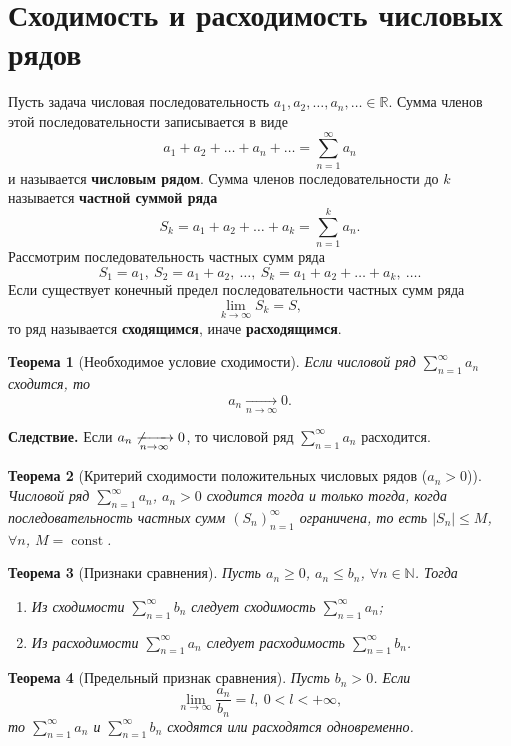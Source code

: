 \documentclass[a4paper, 12pt]{report}
\date{}
\numberwithin{equation}{section}
\renewcommand{\leq}{\leqslant}
\renewcommand{\geq}{\geqslant}
\newcommand{\const}{\operatorname{const}}
\newcommand{\sumn}{\sum\limits_{n=1}^\infty}
\newcommand{\sumnk}{\sum\limits_{n=1}^k}
\newtheorem*{theorem}{Теорема}
\begin{document}
	\newpage
	\section{Сходимость и расходимость числовых рядов}
	Пусть задача числовая последовательность $a_1, a_2,\ldots, a_n,\ldots \in \mathbb R$. 
	Сумма членов этой последовательности записывается в виде
	\begin{equation}
		a_1 + a_2 + \ldots + a_n + \ldots = \sumn a_n
	\end{equation}
	и называется \textbf{числовым рядом}.
	Сумма членов последовательности до $k$ называется \textbf{частной суммой ряда}
	\begin{equation}
		S_k = a_1 + a_2 + \ldots + a_k = \sumnk a_n.
	\end{equation}
	Рассмотрим последовательность частных сумм ряда
	\begin{equation*}
		S_1 = a_1,\ S_2 = a_1 + a_2,\ \ldots,\ S_k = a_1 + a_2 + \ldots + a_k,\ \ldots.
	\end{equation*}
	Если существует конечный предел последовательности частных сумм ряда
	\begin{equation*}
		\lim\limits_{k\to \infty}S_k = S,
	\end{equation*}
	то ряд называется \textbf{сходящимся}, иначе \textbf{расходящимся}.
	\begin{theorem}
		[Необходимое условие сходимости]
		Если числовой ряд $\sumn a_n$ сходится, то $$a_n \xrightarrow[n\to \infty]{}0.$$
	\end{theorem}
	\noindent\textbf{Следствие.} Если $a_n \not\xrightarrow[n\to \infty]{}0$, то числовой ряд $\sumn a_n$ расходится.
	\begin{theorem}
		[Критерий сходимости положительных числовых рядов ($a_n > 0$)]
		Числовой ряд $\sumn a_n$, $a_n > 0$ сходится тогда и только тогда, когда последовательность частных сумм $(S_n)_{n=1}^\infty$ ограничена, то есть $|S_n| \leq M$, $\forall n$, $M = \const$.
	\end{theorem}
	\begin{theorem}
		[Признаки сравнения]
		Пусть $a_n \geq 0$, $a_n \leq b_n$, $\forall n \in \mathbb N$. Тогда
		\begin{enumerate}
			\item Из сходимости $\sumn b_n$ следует сходимость $\sumn a_n$;
			\item Из расходимости $\sumn a_n$ следует расходимость $\sumn b_n$.
		\end{enumerate}
	\end{theorem}
	\begin{theorem}
		[Предельный признак сравнения]
		Пусть $b_n > 0$. Если \begin{equation}
			\lim\limits_{n\to\infty} \dfrac{a_n}{b_n} = l,\ 0 < l < +\infty,
		\end{equation}
		то $\sumn a_n$ и $\sumn b_n$ сходятся или расходятся одновременно.
	\end{theorem}
\end{document}
